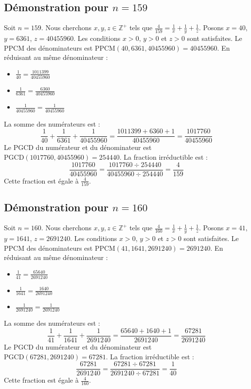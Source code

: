 \documentclass[11pt,a4paper]{article}
\begin{document}
\subsection{Démonstration pour $n = 159$}
Soit $n = 159$. Nous cherchons $x, y, z \in \mathbb{Z}^{+}$ tels que $\frac{4}{159} = \frac{1}{x} + \frac{1}{y} + \frac{1}{z}$.
Posons $x = 40$, $y = 6361$, $z = 40455960$.
Les conditions $x > 0$, $y > 0$ et $z > 0$ sont satisfaites.
Le PPCM des dénominateurs est $\text{PPCM}(40, 6361, 40455960) = 40455960$.
En réduisant au même dénominateur :
\begin{itemize}
    \item $\frac{1}{40} = \frac{1011399}{40455960}$
    \item $\frac{1}{6361} = \frac{6360}{40455960}$
    \item $\frac{1}{40455960} = \frac{1}{40455960}$
\end{itemize}
La somme des numérateurs est :
$$ \frac{1}{40} + \frac{1}{6361} + \frac{1}{40455960} = \frac{1011399 + 6360 + 1}{40455960} = \frac{1017760}{40455960} $$
Le PGCD du numérateur et du dénominateur est $\text{PGCD}(1017760, 40455960) = 254440$.
La fraction irréductible est :
$$ \frac{1017760}{40455960} = \frac{1017760 \div 254440}{40455960 \div 254440} = \frac{4}{159} $$
Cette fraction est égale à $\frac{4}{159}$.

\subsection{Démonstration pour $n = 160$}
Soit $n = 160$. Nous cherchons $x, y, z \in \mathbb{Z}^{+}$ tels que $\frac{4}{160} = \frac{1}{x} + \frac{1}{y} + \frac{1}{z}$.
Posons $x = 41$, $y = 1641$, $z = 2691240$.
Les conditions $x > 0$, $y > 0$ et $z > 0$ sont satisfaites.
Le PPCM des dénominateurs est $\text{PPCM}(41, 1641, 2691240) = 2691240$.
En réduisant au même dénominateur :
\begin{itemize}
    \item $\frac{1}{41} = \frac{65640}{2691240}$
    \item $\frac{1}{1641} = \frac{1640}{2691240}$
    \item $\frac{1}{2691240} = \frac{1}{2691240}$
\end{itemize}
La somme des numérateurs est :
$$ \frac{1}{41} + \frac{1}{1641} + \frac{1}{2691240} = \frac{65640 + 1640 + 1}{2691240} = \frac{67281}{2691240} $$
Le PGCD du numérateur et du dénominateur est $\text{PGCD}(67281, 2691240) = 67281$.
La fraction irréductible est :
$$ \frac{67281}{2691240} = \frac{67281 \div 67281}{2691240 \div 67281} = \frac{1}{40} $$
Cette fraction est égale à $\frac{4}{160}$.
\end{document}
